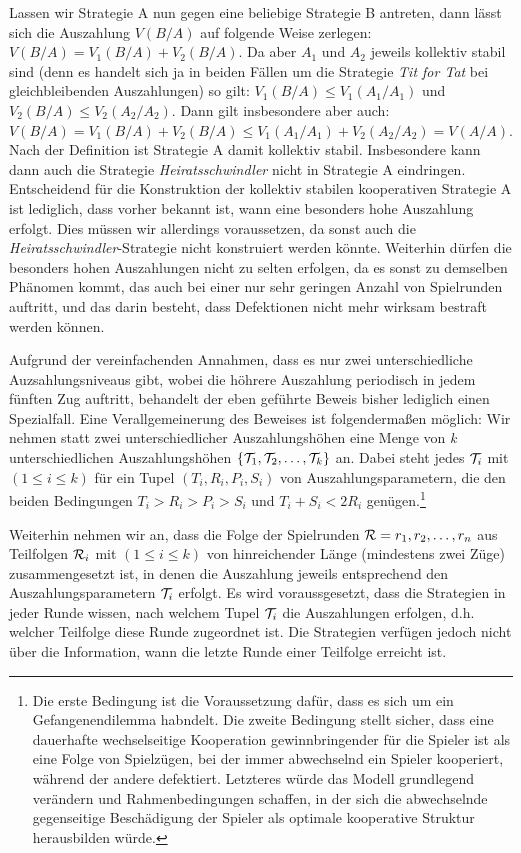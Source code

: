 \documentclass[12pt,a4paper,ngerman]{article}
\begin{document}
Lassen wir Strategie A nun gegen eine beliebige Strategie B antreten,
dann lässt sich die Auszahlung $V(B/A)$ auf folgende Weise zerlegen:
$V(B/A) = V_1(B/A) + V_2(B/A)$. Da aber $A_1$ und $A_2$ jeweils
kollektiv stabil sind (denn es handelt sich ja in beiden Fällen um die
Strategie {\em Tit for Tat} bei gleichbleibenden Auszahlungen) so
gilt: $V_1(B/A) \le V_1(A_1/A_1)$ und $V_2(B/A) \le
V_2(A_2/A_2)$.
Dann gilt insbesondere aber auch:
$V(B/A) = V_1(B/A) + V_2(B/A) \le V_1(A_1/A_1) + V_2(A_2/A_2) =
V(A/A)$.
Nach der Definition ist Strategie A damit kollektiv
stabil. Insbesondere kann dann auch die Strategie {\em
  Heiratsschwindler} nicht in Strategie A eindringen. Entscheidend für
die Konstruktion der kollektiv stabilen kooperativen Strategie A ist
lediglich, dass vorher bekannt ist, wann eine besonders hohe
Auszahlung erfolgt. Dies müssen wir allerdings voraussetzen, da sonst
auch die {\em Heiratsschwindler}-Strategie nicht konstruiert werden
könnte. Weiterhin dürfen die besonders hohen Auszahlungen nicht zu
selten erfolgen, da es sonst zu demselben Phänomen kommt, das auch bei
einer nur sehr geringen Anzahl von Spielrunden auftritt, und das darin
besteht, dass Defektionen nicht mehr wirksam bestraft werden können.

Aufgrund der vereinfachenden Annahmen, dass es nur zwei
unterschiedliche Auzsahlungsniveaus gibt, wobei die höhrere Auszahlung
periodisch in jedem fünften Zug auftritt, behandelt der eben geführte
Beweis bisher lediglich einen Spezialfall. Eine Verallgemeinerung des
Beweises ist folgendermaßen möglich: Wir nehmen statt zwei
unterschiedlicher Auszahlungshöhen eine Menge von {\em k}
unterschiedlichen Auszahlungshöhen
$\left\lbrace {\cal T}_1,{\cal T}_2,\ldots,{\cal T}_k \right\rbrace$
an. Dabei steht jedes ${\cal T}_i$ mit $\left( 1 \le i \le k\right) $
für ein Tupel $\left( T_i,R_i,P_i,S_i\right) $ von
Auszahlungsparametern, die den beiden Bedingungen
$ T_i > R_i > P_i > S_i $ und $ T_i + S_i < 2R_i $
genügen.\footnote{Die erste Bedingung ist die Voraussetzung dafür,
  dass es sich um ein Gefangenendilemma habndelt. Die zweite Bedingung
  stellt sicher, dass eine dauerhafte wechselseitige Kooperation
  gewinnbringender für die Spieler ist als eine Folge von Spielzügen,
  bei der immer abwechselnd ein Spieler kooperiert, während der andere
  defektiert. Letzteres würde das Modell grundlegend verändern und
  Rahmenbedingungen schaffen, in der sich die abwechselnde
  gegenseitige Beschädigung der Spieler als optimale kooperative
  Struktur herausbilden würde.}

Weiterhin nehmen wir an, dass die Folge der Spielrunden
${\cal R}=r_1, r_2,\ldots, r_n$ aus Teilfolgen ${\cal R}_i$ mit
$\left( 1 \le i \le k\right) $ von hinreichender Länge (mindestens
zwei Züge) zusammengesetzt ist, in denen die Auszahlung jeweils
entsprechend den Auszahlungsparametern ${\cal T}_i$ erfolgt. Es wird
voraussgesetzt, dass die Strategien in jeder Runde wissen, nach
welchem Tupel ${\cal T}_i$ die Auszahlungen erfolgen, d.h. welcher
Teilfolge diese Runde zugeordnet ist. Die Strategien verfügen jedoch
nicht über die Information, wann die letzte Runde einer Teilfolge
erreicht ist.
\end{document}
